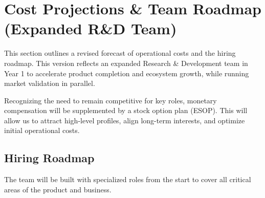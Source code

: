
\section*{Cost Projections \& Team Roadmap (Expanded R\&D Team)}
This section outlines a revised forecast of operational costs and the hiring roadmap. This version reflects an expanded Research \& Development team in Year 1 to accelerate product completion and ecosystem growth, while running market validation in parallel.

Recognizing the need to remain competitive for key roles, monetary compensation will be supplemented by a stock option plan (ESOP). This will allow us to attract high-level profiles, align long-term interests, and optimize initial operational costs.

\subsection*{Hiring Roadmap}
The team will be built with specialized roles from the start to cover all critical areas of the product and business.
